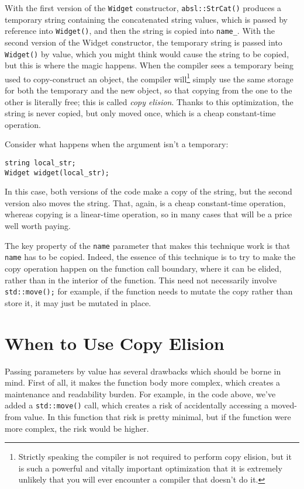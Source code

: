 With the first version of the \texttt{Widget} constructor, \texttt{absl::StrCat()} produces a temporary string containing the concatenated string values, which is passed by reference into \texttt{Widget()}, and then the string is copied into \texttt{name_}. With the second version of the Widget constructor, the temporary string is passed into \texttt{Widget()} by value, which you might think would cause the string to be copied, but this is where the magic happens. When the compiler sees a temporary being used to copy-construct an object, the compiler will\footnote{Strictly speaking the compiler is not required to perform copy elision, but it is such a powerful and vitally important optimization that it is extremely unlikely that you will ever encounter a compiler that doesn’t do it.} simply use the same storage for both the temporary and the new object, so that copying from the one to the other is literally free; this is called \emph{copy elision}. Thanks to this optimization, the string is never copied, but only moved once, which is a cheap constant-time operation.

Consider what happens when the argument isn’t a temporary:

\begin{verbatim}
string local_str;
Widget widget(local_str);
\end{verbatim}

In this case, both versions of the code make a copy of the string, but the second version also moves the string. That, again, is a cheap constant-time operation, whereas copying is a linear-time operation, so in many cases that will be a price well worth paying.

The key property of the \texttt{name} parameter that makes this technique work is that \texttt{name} has to be copied. Indeed, the essence of this technique is to try to make the copy operation happen on the function call boundary, where it can be elided, rather than in the interior of the function. This need not necessarily involve \texttt{std::move();} for example, if the function needs to mutate the copy rather than store it, it may just be mutated in place.

\section{When to Use Copy Elision}
Passing parameters by value has several drawbacks which should be borne in mind. First of all, it makes the function body more complex, which creates a maintenance and readability burden. For example, in the code above, we’ve added a \texttt{std::move()} call, which creates a risk of accidentally accessing a moved-from value. In this function that risk is pretty minimal, but if the function were more complex, the risk would be higher.

